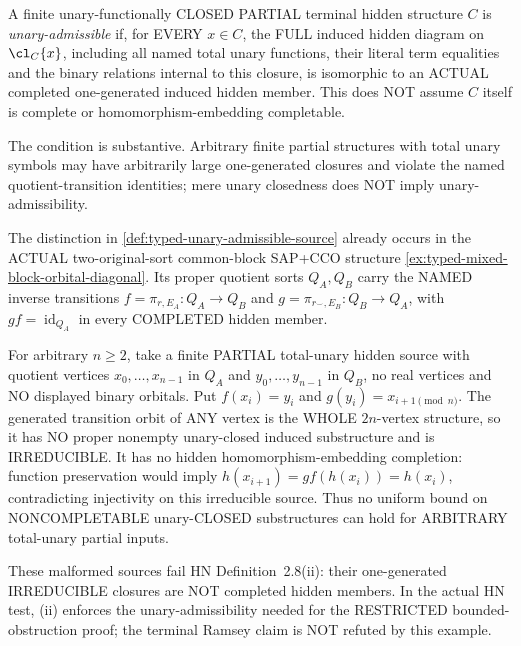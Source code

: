 \begin{definition}
\label{def:typed-unary-admissible-source}
A finite unary-functionally CLOSED PARTIAL terminal hidden
structure \(C\) is \emph{unary-admissible} if, for EVERY
\(x\in C\), the FULL induced hidden diagram on
\(\cl_C\{x\}\), including all named total unary functions,
their literal term equalities and the binary relations
internal to this closure, is isomorphic to an ACTUAL
completed one-generated induced hidden member.
This does NOT assume \(C\) itself is complete or
homomorphism-embedding completable.

The condition is substantive. Arbitrary finite partial
structures with total unary symbols may have arbitrarily
large one-generated closures and violate the named
quotient-transition identities; mere unary closedness
does NOT imply unary-admissibility.
\end{definition}

\begin{example}
\label{ex:typed-malformed-unary-long-cycles}
The distinction in
\cref{def:typed-unary-admissible-source}
already occurs in the ACTUAL two-original-sort
common-block SAP+CCO structure
\cref{ex:typed-mixed-block-orbital-diagonal}.
Its proper quotient sorts $Q_A,Q_B$ carry the
NAMED inverse transitions
$f=\pi_{r,E_A}:Q_A\to Q_B$
and $g=\pi_{r^\smile,E_B}:Q_B\to Q_A$,
with $g f=\operatorname{id}_{Q_A}$
in every COMPLETED hidden member.

For arbitrary $n\ge2$, take a finite
PARTIAL total-unary hidden source
with quotient vertices $x_0,\ldots,x_{n-1}$
in $Q_A$ and $y_0,\ldots,y_{n-1}$
in $Q_B$, no real vertices and
NO displayed binary orbitals.
Put $f(x_i)=y_i$ and
$g(y_i)=x_{i+1\pmod n}$.
The generated transition orbit of ANY vertex
is the WHOLE $2n$-vertex structure,
so it has NO proper nonempty
unary-closed induced substructure and
is IRREDUCIBLE. It has no hidden
homomorphism-embedding completion:
function preservation would imply
$h(x_{i+1})=g f(h(x_i))=h(x_i)$,
contradicting injectivity on this irreducible source.
Thus no uniform bound on NONCOMPLETABLE
unary-CLOSED substructures can hold for
ARBITRARY total-unary partial inputs.

These malformed sources fail
HN Definition~2.8(ii): their
one-generated IRREDUCIBLE closures
are NOT completed hidden members.
In the actual HN test, (ii) enforces the
unary-admissibility needed for the
RESTRICTED bounded-obstruction proof;
the terminal Ramsey claim is NOT
refuted by this example.
\end{example}

